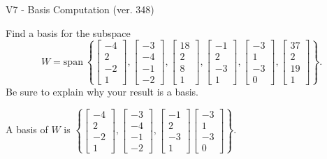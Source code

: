 \begin{exercise}
  \begin{exerciseTitle}V7 - Basis Computation (ver. 348)\end{exerciseTitle}
  \begin{exerciseStatement}
    Find a basis for the subspace 
\[W=\mathrm{span}\ \left\{\left[\begin{array}{r}
-4 \\
2 \\
-2 \\
1
\end{array}\right] , \left[\begin{array}{r}
-3 \\
-4 \\
-1 \\
-2
\end{array}\right] , \left[\begin{array}{r}
18 \\
2 \\
8 \\
1
\end{array}\right] , \left[\begin{array}{r}
-1 \\
2 \\
-3 \\
1
\end{array}\right] , \left[\begin{array}{r}
-3 \\
1 \\
-3 \\
0
\end{array}\right] , \left[\begin{array}{r}
37 \\
2 \\
19 \\
1
\end{array}\right]\right\}.\]
 Be sure to explain why your result is a basis.


  \end{exerciseStatement}
  \begin{exerciseAnswer}
   A basis of \(W\) is  \(\left\{\left[\begin{array}{r}
-4 \\
2 \\
-2 \\
1
\end{array}\right] , \left[\begin{array}{r}
-3 \\
-4 \\
-1 \\
-2
\end{array}\right] , \left[\begin{array}{r}
-1 \\
2 \\
-3 \\
1
\end{array}\right] \left[\begin{array}{r}
-3 \\
1 \\
-3 \\
0
\end{array}\right]\right\}\).
  


  \end{exerciseAnswer}
\end{exercise}